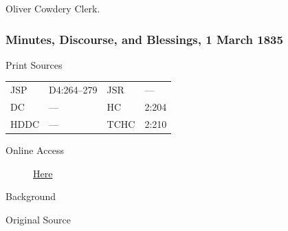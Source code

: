 				\begin{tightright}
				Oliver Cowdery Clerk.
				\end{tightright}

		\subsubsection{Minutes, Discourse, and Blessings, 1 March 1835}
			\label{EMS-1835-JS-1-MAR-1835}
			
			\begin{description}
				\item[Print Sources]
			\end{description}

				\begin{tabular}{p{0.5in}p{1in}p{0.5in}p{1in}}
				JSP	 	& D4:264--279		& JSR 		& --- \\
				DC	 	& --- 				& HC 		& 2:204 \\
				HDDC 	& ---				& TCHC 		& 2:210 \\
				\end{tabular}
			
			\begin{description}
				\item[Online Access] \href{https://www.josephsmithpapers.org/paper-summary/minutes-discourse-and-blessings-1-march-1835/1}{Here}
			\end{description}
			
			\begin{description}
				\item[Background]
			\end{description}
			
			
			\begin{description}
				\item[Original Source]
			\end{description}
			
			
